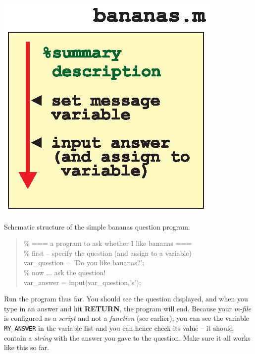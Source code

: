 \documentclass{tufte-book} %
\newenvironment{docspec}{\begin{quotation}\ttfamily\parskip0pt\parindent0pt\ignorespaces}{\end{quotation}}
\begin{document}
\begin{marginfigure}[0.0in]
\includegraphics[width=\linewidth]{ch2-bananas.eps}
\caption{Schematic structure of the simple bananas question program.}
\label{fig:ch2-bananas}
\end{marginfigure}

\begin{docspec}
\textcolor[rgb]{0,0.501961,0}{\% === a program to ask whether I like bananas ===
\\\% first -- specify the question (and assign to a variable)}
\\var\_question\textcolor[rgb]{1,0,1}{ = 'Do you like bananas?'};
\textcolor[rgb]{0,0.501961,0}{\\\% now ... ask the question!}
\\var\_answer = input(var\_question,\textcolor[rgb]{1,0,1}{'s'});
\end{docspec}

Run the program thus far. You should see the question displayed, and when you type in an answer and hit \textbf{RETURN}, the program will end. Because your \textit{m-file} is configured as a \textit{script} and not a \textit{function} (see earlier), you can see the variable \texttt{MY\_ANSWER} in the variable list and you can hence check its value -- it should contain a \textit{string} with the answer you gave to the question. Make sure it all works like this so far.
\end{document}

